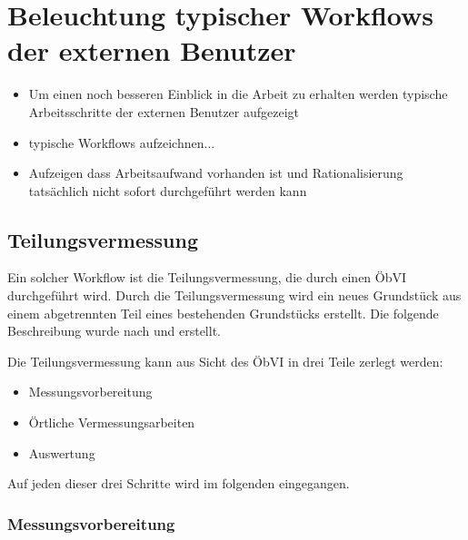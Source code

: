 \section{Beleuchtung typischer Workflows der externen Benutzer}
\begin{itemize}
	\item Um einen noch besseren Einblick in die Arbeit zu erhalten werden typische Arbeitsschritte der externen Benutzer aufgezeigt
	\item typische Workflows aufzeichnen...
	\item Aufzeigen dass Arbeitsaufwand vorhanden ist und Rationalisierung tatsächlich nicht sofort durchgeführt werden kann
\end{itemize}

\subsection{Teilungsvermessung}
Ein solcher Workflow ist die Teilungsvermessung, die durch einen \ac{ÖbVI} durchgeführt wird. Durch die Teilungsvermessung wird ein neues Grundstück aus einem abgetrennten Teil eines bestehenden Grundstücks erstellt. Die folgende Beschreibung wurde nach \autocite{klein-vermessung} und \autocite{jungemann-alltag} erstellt.

Die Teilungsvermessung kann aus Sicht des \ac{ÖbVI} in drei Teile zerlegt werden:
\begin{itemize}
	\item Messungsvorbereitung
	\item Örtliche Vermessungsarbeiten
	\item Auswertung
\end{itemize}

Auf jeden dieser drei Schritte wird im folgenden eingegangen.

\subsubsection{Messungsvorbereitung}

